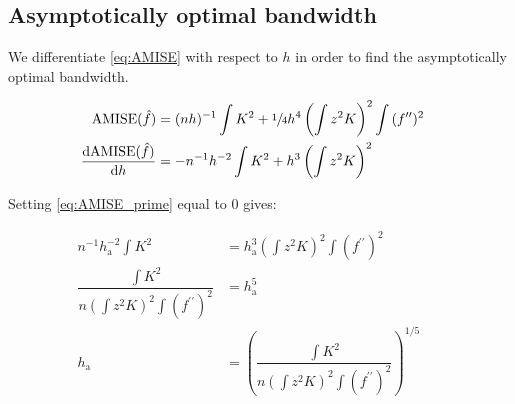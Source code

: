 \subsection{Asymptotically optimal bandwidth}

We differentiate \autoref{eq:AMISE} with respect to $h$ in order to find the asymptotically optimal bandwidth.

\begin{align}
\mbox{AMISE}(\hat{f}) & = (nh)^{-1} \int{K^2} + \sfrac{1}{4}h^4\left(\int{z^2K}\right)^2 \int{ (f^{\prime\prime})^2 } && \nonumber \\
\dfrac{\mathrm{d}\mbox{AMISE}(\hat{f})}{\mathrm{d}h} & = -n^{-1}h^{-2} \int{K^2} + h^3 \left(\int{z^2K}\right)^2 && \label{eq:AMISE_prime}
\end{align}

Setting \autoref{eq:AMISE_prime} equal to 0 gives:

\begin{align}
n^{-1}h_{\mbox{a}}^{-2} \int{K^2} & = h_{\mbox{a}}^3 \left(\int{z^2K}\right)^2 \int{ (f^{\prime\prime})^2 } && \nonumber \\
\dfrac{\int{K^2}}{n \left(\int{z^2K}\right)^2 \int{ (f^{\prime\prime})^2 }} & = h_{\mbox{a}}^5 && \nonumber \\
h_{\mbox{a}} & = \left( \dfrac{\int{K^2}}{n \left(\int{z^2K}\right)^2 \int{ (f^{\prime\prime})^2 }} \right)^{1/5} && \label{eq:H_AMISE}
\end{align}

